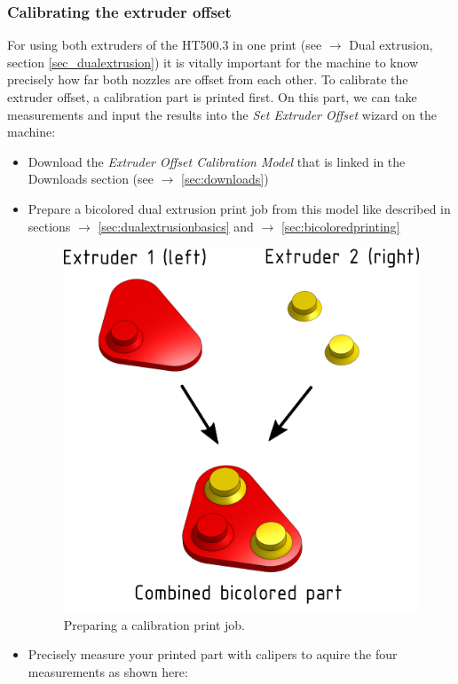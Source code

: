 \subsubsection{Calibrating the extruder offset} \label{sec:offsetcalibration}

For using both extruders of the HT500.3 in one print (see $\rightarrow$ Dual extrusion, section \ref{sec_dualextrusion}) it is vitally important for the machine to know precisely how far both nozzles are offset from each other. To calibrate the extruder offset, a calibration part is printed first. On this part, we can take measurements and input the results into the \emph{Set Extruder Offset} wizard on the machine:

\begin{itemize}
  \item Download the \emph{Extruder Offset Calibration Model} that is linked in the Downloads
        section (see $\rightarrow$ \ref{sec:downloads})
  \item Prepare a bicolored dual extrusion print job from this model like described in sections
        $\rightarrow$ \ref{sec:dualextrusionbasics} and $\rightarrow$ \ref{sec:bicoloredprinting}

  \begin{figure}[H]
    \centering
    \includegraphics[width=.5\linewidth]{./img/calibrate_offset_modeloverview.png}
    \caption{Preparing a calibration print job.}
  \end{figure}

  \item Precisely measure your printed part with calipers to aquire the four measurements as shown here:


\end{itemize}
